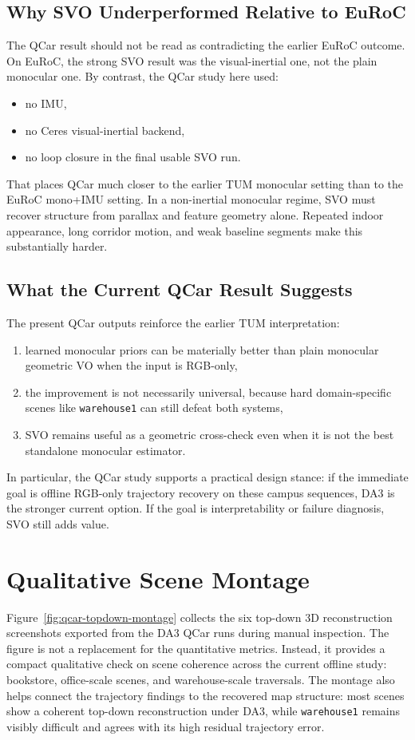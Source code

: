 \documentclass[conference]{IEEEtran}
\newcommand{\code}[1]{\mbox{\texttt{#1}}}
\begin{document}
\subsection{Why SVO Underperformed Relative to EuRoC}
The QCar result should not be read as contradicting the earlier EuRoC outcome. On EuRoC, the strong SVO result was the visual-inertial one, not the plain monocular one. By contrast, the QCar study here used:
\begin{itemize}
\item no IMU,
\item no Ceres visual-inertial backend,
\item no loop closure in the final usable SVO run.
\end{itemize}

That places QCar much closer to the earlier TUM monocular setting than to the EuRoC mono+IMU setting. In a non-inertial monocular regime, SVO must recover structure from parallax and feature geometry alone. Repeated indoor appearance, long corridor motion, and weak baseline segments make this substantially harder.

\subsection{What the Current QCar Result Suggests}
The present QCar outputs reinforce the earlier TUM interpretation:
\begin{enumerate}
\item learned monocular priors can be materially better than plain monocular geometric VO when the input is RGB-only,
\item the improvement is not necessarily universal, because hard domain-specific scenes like \code{warehouse1} can still defeat both systems,
\item SVO remains useful as a geometric cross-check even when it is not the best standalone monocular estimator.
\end{enumerate}

In particular, the QCar study supports a practical design stance: if the immediate goal is offline RGB-only trajectory recovery on these campus sequences, DA3 is the stronger current option. If the goal is interpretability or failure diagnosis, SVO still adds value.

\section{Qualitative Scene Montage}
Figure~\ref{fig:qcar-topdown-montage} collects the six top-down 3D reconstruction screenshots exported from the DA3 QCar runs during manual inspection. The figure is not a replacement for the quantitative metrics. Instead, it provides a compact qualitative check on scene coherence across the current offline study: bookstore, office-scale scenes, and warehouse-scale traversals. The montage also helps connect the trajectory findings to the recovered map structure: most scenes show a coherent top-down reconstruction under DA3, while \code{warehouse1} remains visibly difficult and agrees with its high residual trajectory error.
\end{document}
